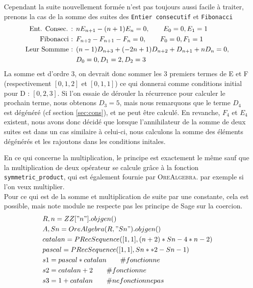 \documentclass[12pt]{article}
\begin{document}
        \par Cependant la suite nouvellement formée n'est pas toujours aussi facile à traiter, prenons la cas
        de la somme des suites des  \texttt{Entier consecutif} et \texttt{Fibonacci}
        \begin{align*}
            \textnormal{Ent. Consec. : } &nE_{n+1} - (n+1)E_n = 0,\qquad E_0 = 0, E_1 = 1\\
            \textnormal{Fibonacci : } &F_{n+2} - F_{n+1} - F_n = 0,\qquad F_0=0, F_1=1\\
            \textnormal{Leur Sommme : } &(n - 1)D_{n+3} + (-2n + 1)D_{n+2} + D_{n+1} + nD_n = 0, \\
            &D_0 = 0, D_1 = 2, D_2 = 3\\
        \end{align*} 
        La somme est d'ordre 3, on devrait donc sommer les 3 premiers termes de E et F (respectivement 
        $[0,1,2]$ et $[0,1,1]$) ce qui donnerai comme conditions initial pour D : $[0,2,3]$.
        Si 
        l'on essaie de dérouler la récurrence pour calculer le prochain terme, nous obtenons $D_3 = 5$,
        mais nous remarquons que le terme $D_4$ est dégénéré (cf section \ref{sec:cons}), et ne peut 
        être calculé. En revanche, $F_4$ et $E_4$ existent, nous avons donc décidé que lorsque l'annihilateur
        de la somme de deux suites est dans un cas similaire à celui-ci, nous calculons la somme des
        éléments dégénérés et les rajoutons dans les conditions initales.
        \par En ce qui concerne la multiplication, le principe est exactement le même sauf que la 
        multiplication de deux opérateur se calcule grâce à la fonction \texttt{symmetric\_product},
        qui est également fournie par \textsc{OreAlgebra}.
        par exemple si l'on veux multiplier.\\
        Pour ce qui est de la somme et multiplication de suite par une constante, cela est possible, mais 
        note module ne respecte pas les principe de Sage sur la coercion.
        \begin{align*}
            &R,n = ZZ["n"].objgen()\\
            &A,Sn = OreAlgebra(R,"Sn").objgen()\\
            &catalan = PRecSequence([1,1],(n + 2)*Sn - 4*n - 2)\\
            &pascal = PRecSequence([1,1],Sn**2 - Sn - 1)\\
            &s1 = pascal * catalan \qquad\# fonctionne\\
            &s2 = catalan + 2 \qquad\# fonctionne\\
            &s3 = 1 + catalan \qquad\# ne fonctionne pas\\
        \end{align*} \\
\end{document}
